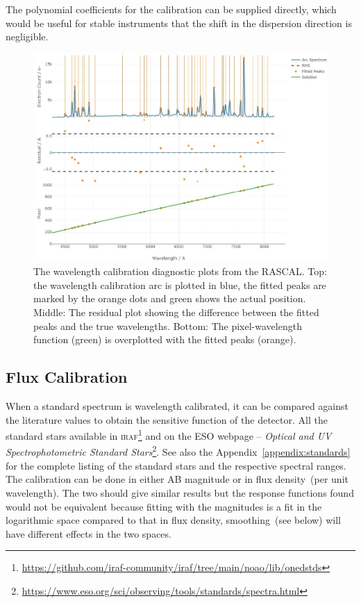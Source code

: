 \documentclass[fleqn,usenatbib]{mnras}
\begin{document}
The polynomial coefficients for the calibration can be supplied
directly, which would be useful for stable instruments that
the shift in the dispersion direction is negligible.

\begin{figure}
    \centering
    \includegraphics[width=\columnwidth]{fig_05_wavelength_calibration_diagnostics.jpg}
    \caption{The wavelength calibration diagnostic plots from the
    RASCAL. Top: the wavelength calibration arc is plotted in blue,
    the fitted peaks are marked by the orange dots and green shows
    the actual position. Middle: The residual plot showing the
    difference between the fitted peaks and the true wavelengths.
    Bottom: The pixel-wavelength function (green) is overplotted with
    the fitted peaks (orange).}
    \label{fig:wavecal}
\end{figure}

\subsection{Flux Calibration}
When a standard spectrum is wavelength calibrated, it can be
compared against the literature values to obtain the sensitive
function of the detector. All the standard stars available in
\textsc{iraf}\footnote{\url{https://github.com/iraf-community/iraf/tree/main/noao/lib/onedstds}}
and on the ESO webpage -- \textit{Optical and UV Spectrophotometric
Standard Stars}\footnote{\url{https://www.eso.org/sci/observing/tools/standards/spectra.html}}.
See also the Appendix~\ref{appendix:standards} for the complete listing of the standard
stars and the respective spectral ranges.
The calibration can be done in either AB magnitude or in
flux density~(per unit wavelength). The two should give similar
results but the response functions found would not be equivalent
because fitting with the magnitudes is a fit in the logarithmic
space compared to that in flux density, smoothing~(see below)
will have different effects in the two spaces.
\end{document}
